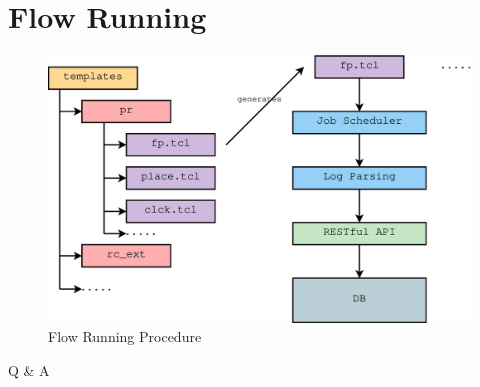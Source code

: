 \documentclass{beamer}
\begin{document}
\section{Flow Running} %

\begin{frame}
  \begin{figure}
    \centering
    \includegraphics[width=0.80\linewidth]{flow_proc}
    \caption{Flow Running Procedure}
  \end{figure}
\end{frame}


\begin{frame}
  \Huge{\centerline{Q \& A}}
\end{frame}

\end{document}
